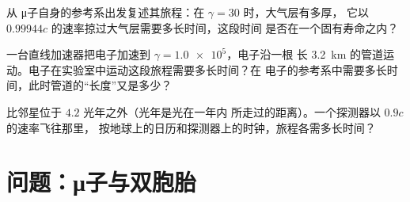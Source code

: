 \begin{exercise}[$\star\star\star$]\label{exo:g12:special-relativity:13}
从 μ子自身的参考系出发复述其旅程：在 $\gamma = 30$ 时，大气层有多厚，
它以 $0.99944c$ 的速率掠过大气层需要多长时间，这段时间
是否在一个固有寿命之内？
\end{exercise}

\begin{exercise}[$\star\star\star$]\label{exo:g12:special-relativity:14}
一台直线加速器把电子加速到 $\gamma = \num{1.0e5}$，电子沿一根
长 \qty{3.2}{km} 的管道运动。电子在实验室中运动这段旅程需要多长时间？在
电子的参考系中需要多长时间，此时管道的“长度”又是多少？
\end{exercise}

\begin{exercise}[$\star\star\star$]\label{exo:g12:special-relativity:15}
比邻星位于 $4.2$ 光年之外（光年是光在一年内
所走过的距离）。一个探测器以 $0.9c$ 的速率飞往那里，
按地球上的日历和探测器上的时钟，旅程各需多长时间？
\end{exercise}

\section{问题：μ子与双胞胎}

